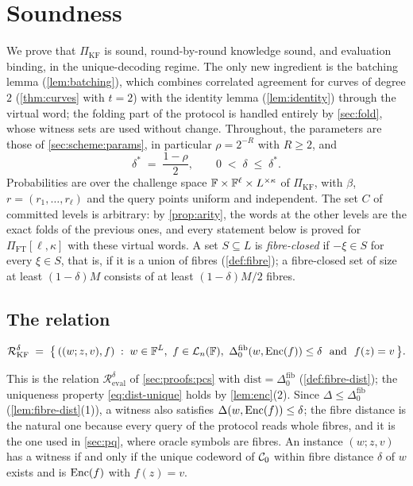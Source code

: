 \section{Soundness}\label{sec:sound}

We prove that $\Pi_{\mathrm{KF}}$ is sound, round-by-round knowledge sound, and evaluation binding, in the unique-decoding regime.
The only new ingredient is the batching lemma (\cref{lem:batching}), which combines correlated agreement for curves of degree $2$ (\cref{thm:curves} with $t = 2$) with the identity lemma (\cref{lem:identity}) through the virtual word; the folding part of the protocol is handled entirely by \cref{sec:fold}, whose witness sets are used without change.
Throughout, the parameters are those of \cref{sec:scheme:params}, in particular $\rho = 2^{-R}$ with $R \ge 2$, and
\[
  \delta^* \;=\; \frac{1-\rho}{2}, \qquad 0 \;<\; \delta \;\le\; \delta^* .
\]
Probabilities are over the challenge space $\mathbb{F} \times \mathbb{F}^\ell \times L^{\times\kappa}$ of $\Pi_{\mathrm{KF}}$, with $\beta$, $r = (r_1,\dots,r_\ell)$ and the query points uniform and independent. The set $C$ of committed levels is arbitrary: by \cref{prop:arity}, the words at the other levels are the exact folds of the previous ones, and every statement below is proved for $\Pi_{\mathrm{FT}}[\ell,\kappa]$ with these virtual words.
A set $S \subseteq L$ is \emph{fibre-closed} if $-\xi \in S$ for every $\xi \in S$, that is, if it is a union of fibres (\cref{def:fibre}); a fibre-closed set of size at least $(1-\delta)M$ consists of at least $(1-\delta)M/2$ fibres.

\subsection{The relation}\label{sec:sound:relation}

\begin{definition}\label{def:relation}
\[
  \mathcal{R}^\delta_{\mathrm{KF}} \;=\; \bigl\{\, ((w; z, v), f) \;:\; w \in \F^L,\ f \in \Ll_n(\F),\ \Delta^{\mathrm{fib}}_0(w, \Enc(f)) \le \delta \ \text{ and } \ f(z) = v \,\bigr\}.
\]
\end{definition}

This is the relation $\mathcal{R}^\delta_{\mathrm{eval}}$ of \cref{sec:proofs:pcs} with $\mathrm{dist} = \Delta^{\mathrm{fib}}_0$ (\cref{def:fibre-dist}); the uniqueness property \eqref{eq:dist-unique} holds by \cref{lem:enc}(2).
Since $\Delta \le \Delta^{\mathrm{fib}}_0$ (\cref{lem:fibre-dist}(1)), a witness also satisfies $\Delta(w, \mathrm{Enc}(f)) \le \delta$; the fibre distance is the natural one because every query of the protocol reads whole fibres, and it is the one used in \cref{sec:pq}, where oracle symbols are fibres.
An instance $(w;z,v)$ has a witness if and only if the unique codeword of $\mathcal{C}_0$ within fibre distance $\delta$ of $w$ exists and is $\mathrm{Enc}(f)$ with $f(z) = v$.

